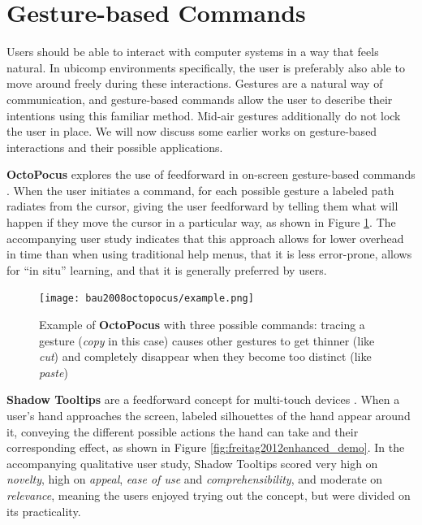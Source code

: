 \section{Gesture-based Commands} \label{sec:relat:gesture-based_commands}
Users should be able to interact with computer systems in a way that feels natural. In ubicomp environments specifically, the user is preferably also able to move around freely during these interactions. Gestures are a natural way of communication, and gesture-based commands allow the user to describe their intentions using this familiar method. Mid-air gestures additionally do not lock the user in place. We will now discuss some earlier works on gesture-based interactions and their possible applications.

\textbf{OctoPocus} explores the use of feedforward in on-screen gesture-based commands \cite{bau2008octopocus}. When the user initiates a command, for each possible gesture a labeled path radiates from the cursor, giving the user feedforward by telling them what will happen if they move the cursor in a particular way, as shown in Figure \ref{fig:bau2008octopocus_demo}. The accompanying user study indicates that this approach allows for lower overhead in time than when using traditional help menus, that it is less error-prone, allows for ``in situ'' learning, and that it is generally preferred by users.

\begin{figure}
    \centering
    \texttt{[image: bau2008octopocus/example.png]}
    \caption{Example of \textbf{OctoPocus} with three possible commands: tracing a gesture (\textit{copy} in this case) causes other gestures to get thinner (like \textit{cut}) and completely disappear when they become too distinct (like \textit{paste}) \cite{bau2008octopocus}}
    \label{fig:bau2008octopocus_demo}
\end{figure}

\textbf{Shadow Tooltips} are a feedforward concept for multi-touch devices \cite{freitag2012enhanced}. When a user's hand approaches the screen, labeled silhouettes of the hand appear around it, conveying the different possible actions the hand can take and their corresponding effect, as shown in Figure \ref{fig:freitag2012enhanced_demo}. In the accompanying qualitative user study, Shadow Tooltips scored very high on \textit{novelty}, high on \textit{appeal}, \textit{ease of use} and \textit{comprehensibility}, and moderate on \textit{relevance}, meaning the users enjoyed trying out the concept, but were divided on its practicality.

